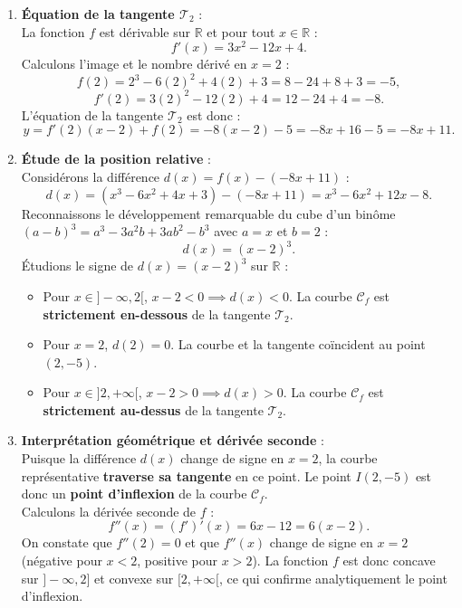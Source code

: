 \documentclass[11pt,a4paper]{article}
\newcommand{\R}{\mathbb{R}}
\begin{document}
\begin{correctionbox}
\begin{enumerate}[label=\textbf{\arabic*.}]
    \item \textbf{Équation de la tangente $\mathcal{T}_2$} :\\
    La fonction $f$ est dérivable sur $\R$ et pour tout $x \in \R$ :
    \[
    f'(x) = 3x^2 - 12x + 4.
    \]
    Calculons l'image et le nombre dérivé en $x = 2$ :
    \[
    f(2) = 2^3 - 6(2)^2 + 4(2) + 3 = 8 - 24 + 8 + 3 = -5,
    \]
    \[
    f'(2) = 3(2)^2 - 12(2) + 4 = 12 - 24 + 4 = -8.
    \]
    L'équation de la tangente $\mathcal{T}_2$ est donc :
    \[
    y = f'(2)(x - 2) + f(2) = -8(x - 2) - 5 = -8x + 16 - 5 = -8x + 11.
    \]

    \item \textbf{Étude de la position relative} :\\
    Considérons la différence $d(x) = f(x) - (-8x + 11)$ :
    \[
    d(x) = (x^3 - 6x^2 + 4x + 3) - (-8x + 11) = x^3 - 6x^2 + 12x - 8.
    \]
    Reconnaissons le développement remarquable du cube d'un binôme $(a-b)^3 = a^3 - 3a^2b + 3ab^2 - b^3$ avec $a = x$ et $b = 2$ :
    \[
    d(x) = (x - 2)^3.
    \]
    Étudions le signe de $d(x) = (x - 2)^3$ sur $\R$ :
    \begin{itemize}
        \item Pour $x \in ]-\infty, 2[$, $x - 2 < 0 \implies d(x) < 0$. La courbe $\mathcal{C}_f$ est \textbf{strictement en-dessous} de la tangente $\mathcal{T}_2$.
        \item Pour $x = 2$, $d(2) = 0$. La courbe et la tangente coïncident au point $(2, -5)$.
        \item Pour $x \in ]2, +\infty[$, $x - 2 > 0 \implies d(x) > 0$. La courbe $\mathcal{C}_f$ est \textbf{strictement au-dessus} de la tangente $\mathcal{T}_2$.
    \end{itemize}

    \item \textbf{Interprétation géométrique et dérivée seconde} :\\
    Puisque la différence $d(x)$ change de signe en $x = 2$, la courbe représentative \textbf{traverse sa tangente} en ce point.
    Le point $I(2, -5)$ est donc un \textbf{point d'inflexion} de la courbe $\mathcal{C}_f$.\\
    Calculons la dérivée seconde de $f$ :
    \[
    f''(x) = (f')'(x) = 6x - 12 = 6(x - 2).
    \]
    On constate que $f''(2) = 0$ et que $f''(x)$ change de signe en $x = 2$ (négative pour $x < 2$, positive pour $x > 2$). La fonction $f$ est donc concave sur $]-\infty, 2]$ et convexe sur $[2, +\infty[$, ce qui confirme analytiquement le point d'inflexion.
\end{enumerate}
\end{correctionbox}
\end{document}

